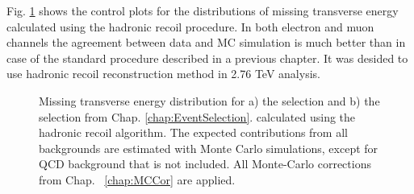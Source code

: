 Fig. \ref{ris:HadrRecoilEtMiss} shows the control plots for the distributions of missing transverse energy calculated using the hadronic recoil procedure. In both electron and muon channels the agreement between data and MC simulation is much better than in case of the standard procedure described in a previous chapter. It was desided to use hadronic recoil \etmiss reconstruction method in 2.76 TeV analysis.


\begin{figure}[!tbp]
\begin{minipage}[h]{0.49\linewidth}
\end{minipage}
\hfill
\begin{minipage}[h]{0.49\linewidth}
\end{minipage}
\caption{Missing transverse energy distribution for a) the \wenu selection and  b) the \wmunu selection from Chap. \ref{chap:EventSelection}. \etmiss  calculated using the hadronic recoil algorithm. The expected contributions from all backgrounds are estimated with Monte Carlo simulations, except for QCD background that is not included. All Monte-Carlo corrections from Chap. ~\ref{chap:MCCor} are applied.}
\label{ris:HadrRecoilEtMiss}
\end{figure}


